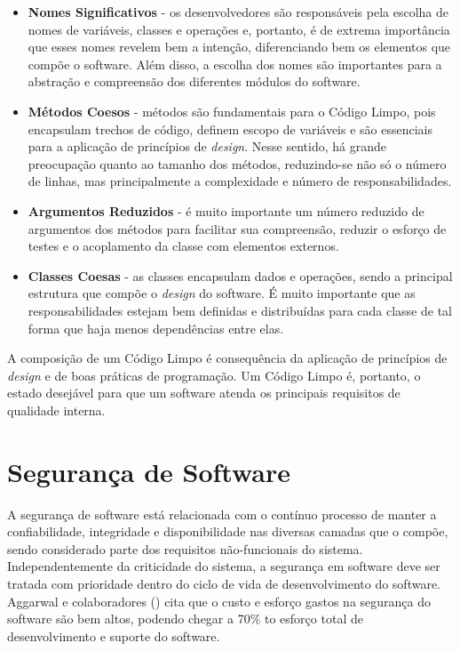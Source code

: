 \begin{itemize}
\item \textbf{Nomes Significativos} - os desenvolvedores são responsáveis pela escolha de nomes de variáveis, classes e operações e, portanto, é de extrema importância que esses nomes revelem bem a intenção, diferenciando bem os elementos que compõe o software. Além disso, a escolha dos nomes são importantes para a abstração e compreensão dos diferentes módulos do software.

\item \textbf{Métodos Coesos} - métodos são fundamentais para o Código Limpo, pois encapsulam trechos de código, definem escopo de variáveis e são essenciais para a aplicação de princípios de \emph{design}. Nesse sentido, há grande preocupação quanto ao tamanho dos métodos, reduzindo-se não só o número de linhas, mas principalmente a complexidade e número de responsabilidades.

\item \textbf{Argumentos Reduzidos} - é muito importante um número reduzido de argumentos dos métodos para facilitar sua compreensão, reduzir o esforço de testes e o acoplamento da classe com elementos externos.

\item \textbf{Classes Coesas} - as classes encapsulam dados e operações, sendo a principal estrutura que compõe o \emph{design} do software. É muito importante que as responsabilidades estejam bem definidas e distribuídas para cada classe de tal forma que haja menos dependências entre elas.
\end{itemize}

%

A composição de um Código Limpo é consequência da aplicação de princípios de \emph{design} e de boas práticas de programação. Um Código Limpo é, portanto, o estado desejável para que um software atenda os principais requisitos de qualidade interna. 



\section{Segurança de Software}
\label{sec-metrics-security}

A segurança de software está relacionada com o contínuo processo de manter a confiabilidade, integridade e disponibilidade nas diversas camadas que o compõe, sendo considerado parte dos requisitos não-funcionais do sistema. Independentemente da criticidade do sistema, a segurança em software deve ser tratada com prioridade dentro do ciclo de vida de desenvolvimento do software. Aggarwal e colaboradores (\citeyear{aggarwal2002}) cita que o custo e esforço gastos na segurança do software são bem altos, podendo chegar a 70\% to esforço total de desenvolvimento e suporte do software.

